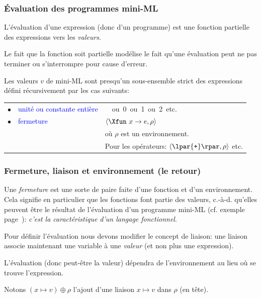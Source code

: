 
%
\begin{frame}
\frametitle{Évaluation des programmes mini-ML}

L'évaluation d'une expression (donc d'un programme) est une fonction
partielle des expressions vers les \emph{valeurs}.

\bigskip

Le fait que la fonction soit partielle modélise le fait qu'une
évaluation peut ne pas terminer ou s'interrompre pour cause d'erreur.

\bigskip

Les valeurs $v$ de mini-ML sont presqu'un sous-ensemble strict des
expressions défini récursivement par les cas suivants:

\begin{tabular}{rll}
    $\bullet$
  & \textcolor{blue}{unité ou constante entière}
  & \unit \ ou \textsf{0} ou \textsf{1} ou \textsf{2} etc.\\
    $\bullet$
  & \textcolor{blue}{fermeture}
  & $\langle\Xfun \,\, x \rightarrow e, \rho\rangle$\\
 && où $\rho$ est un environnement.\\
  &
  & Pour les opérateurs: $\langle\lpar{\texttt{+}}\rpar, \rho\rangle$ etc.
\end{tabular}

\end{frame}

%
\begin{frame}
\frametitle{Fermeture, liaison et environnement (le retour)}

Une \emph{fermeture} est une sorte de paire faite d'une fonction et
d'un environnement. Cela signifie en particulier que les fonctions
font partie des valeurs, c.-à-d. qu'elles peuvent être le résultat de
l'évaluation d'un programme mini-ML (cf. exemple
page~\pageref{maths}): \emph{c'est la caractéristique d'un langage
fonctionnel}.

\bigskip

Pour définir l'évaluation nous devons modifier le concept de liaison:
une liaison associe maintenant une variable à une \emph{valeur} (et
non plus une expression).

\bigskip

L'évaluation (donc peut-être la valeur) dépendra de l'environnement au
lieu où se trouve l'expression.

Notons $(x \mapsto v) \oplus \rho$ l'ajout d'une liaison $x \mapsto v$
dans $\rho$ (en tête).

\end{frame}

